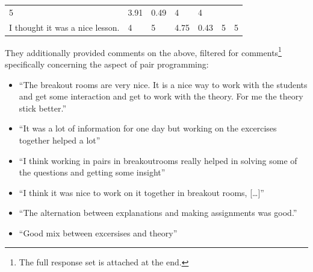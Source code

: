 \documentclass[paper=a4,justified,a4paper]{tufte-handout}
\providecommand{\tightlist}{%
  \setlength{\itemsep}{0pt}\setlength{\parskip}{0pt}}
\begin{document}
\begin{longtable}[]{@{}lllllll@{}}
\begin{minipage}[t]{0.07\columnwidth}
5\strut
\end{minipage} & \begin{minipage}[t]{0.09\columnwidth}\raggedright
3.91\strut
\end{minipage} & \begin{minipage}[t]{0.18\columnwidth}\raggedright
0.49\strut
\end{minipage} & \begin{minipage}[t]{0.13\columnwidth}\raggedright
4\strut
\end{minipage} & \begin{minipage}[t]{0.09\columnwidth}\raggedright
4\strut
\end{minipage}\tabularnewline
\begin{minipage}[t]{0.18\columnwidth}\raggedright
\scriptsize I thought it was a nice lesson.\strut
\end{minipage} & \begin{minipage}[t]{0.07\columnwidth}\raggedright
4\strut
\end{minipage} & \begin{minipage}[t]{0.07\columnwidth}\raggedright
5\strut
\end{minipage} & \begin{minipage}[t]{0.09\columnwidth}\raggedright
4.75\strut
\end{minipage} & \begin{minipage}[t]{0.18\columnwidth}\raggedright
0.43\strut
\end{minipage} & \begin{minipage}[t]{0.13\columnwidth}\raggedright
5\strut
\end{minipage} & \begin{minipage}[t]{0.09\columnwidth}\raggedright
5\strut
\end{minipage}\tabularnewline
\bottomrule
\end{longtable}

They additionally provided comments on the above, filtered for
comments\footnote{The full response set is attached at the end.}
specifically concerning the aspect of pair programming:

\begin{itemize}
\tightlist
\item
  \small ``The breakout rooms are very nice. It is a nice way to work
  with the students and get some interaction and get to work with the
  theory. For me the theory stick better.''
\item
  \small ``It was a lot of information for one day but working on the
  excercises together helped a lot''
\item
  \small ``I think working in pairs in breakoutrooms really helped in
  solving some of the questions and getting some insight''
\item
  \small ``I think it was nice to work on it together in breakout rooms,
  {[}\ldots{}{]}''
\item
  \small ``The alternation between explanations and making assignments
  was good.''
\item
  \small ``Good mix between excersises and theory''
\end{itemize}
\end{document}
